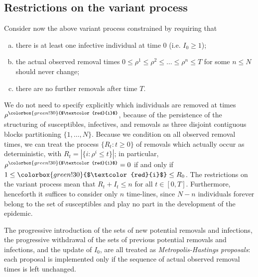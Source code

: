 \documentclass[]{article}
\newcommand{\Population}{N}
\newcommand{\target}{{\colorbox{green!30}{$\textcolor{red}{i}$}}}
\begin{document}
\subsection{Restrictions on the variant process}\label{ssec:restrictions-variant}
Consider now the above variant process
constrained by requiring
that 
\begin{enumerate}[(a)]
	\item there is at least one infective individual at time \(0\) (i.e. \(I_0\ge 1\));
	\item the actual observed removal times
	\(0\le \rho^1\le\rho^2\le\ldots\le\rho^n\le T\) for some \(n\le\Population\) should never change; 
	\item there are no further removals after time \(T\).
\end{enumerate}
We do not need to specify explicitly which individuals are removed at times \(\rho^\target\), because of the persistence of the structuring of susceptibles, infectives, and removals as three disjoint contiguous blocks partitioning \(\{1, \ldots, \Population\}\). 
Because we condition on all observed removal times, we can treat the process \(\{R_t:t\geq0\}\)
of removals which actually occur as deterministic, with \(R_t = |\{i:\rho^i\le t\}|\); in particular, \(\rho^\target = 0\) if and only if \(1\le\target\le R_0\). 
The restrictions on the variant process mean that \(R_t+I_t\le n\) for all \(t\in[0,T]\). 
Furthermore, henceforth it suffices to consider only \(n\) time-lines, since \(\Population-n\) individuals forever belong to the set of susceptibles and play no part in the development of the epidemic.

The progressive introduction of the sets of new potential removals
and infections, the progressive
withdrawal of the sets of previous potential removals and infections, and the update of \(I_0\), are all treated as \emph{Metropolis-Hastings proposals}:
each proposal is
implemented only if the sequence of 
actual observed removal times is left unchanged.
\end{document}

